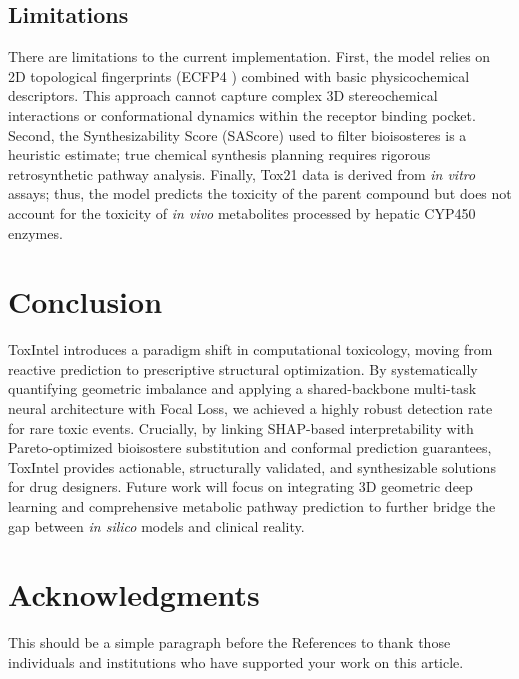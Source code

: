 \documentclass[lettersize,journal]{IEEEtran}
\begin{document}
\subsection{Limitations}
There are limitations to the current implementation. First, the model relies on 2D topological fingerprints (ECFP4 \cite{ref5}) combined with basic physicochemical descriptors. This approach cannot capture complex 3D stereochemical interactions or conformational dynamics within the receptor binding pocket. Second, the Synthesizability Score (SAScore) used to filter bioisosteres is a heuristic estimate; true chemical synthesis planning requires rigorous retrosynthetic pathway analysis. Finally, Tox21 data is derived from \textit{in vitro} assays; thus, the model predicts the toxicity of the parent compound but does not account for the toxicity of \textit{in vivo} metabolites processed by hepatic CYP450 enzymes.

\section{Conclusion}
ToxIntel introduces a paradigm shift in computational toxicology, moving from reactive prediction to prescriptive structural optimization. By systematically quantifying geometric imbalance and applying a shared-backbone multi-task neural architecture with Focal Loss, we achieved a highly robust detection rate for rare toxic events. Crucially, by linking SHAP-based interpretability with Pareto-optimized bioisostere substitution and conformal prediction guarantees, ToxIntel provides actionable, structurally validated, and synthesizable solutions for drug designers. Future work will focus on integrating 3D geometric deep learning and comprehensive metabolic pathway prediction to further bridge the gap between \textit{in silico} models and clinical reality.

\section*{Acknowledgments}
This should be a simple paragraph before the References to thank those individuals and institutions who have supported your work on this article.
\end{document}
